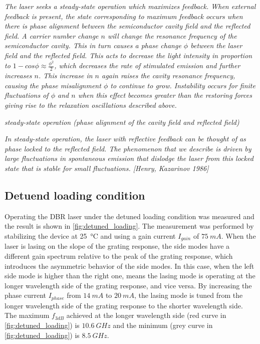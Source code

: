 \textit{The laser seeks a steady-state operation which maximizes feedback. When external feedback is present, the state corresponding to maximum feedback occurs when there is phase alignment  between the semiconductor cavity field and the reflected field. A carrier number change $n$ will change the resonance frequency of the semiconductor cavity. This in turn causes a phase change $\phi$ between the laser field and the reflected field. This acts to decrease the light intensity in proportion to $1-cos{\phi}\approx\frac{\phi^2}{2}$, which decreases the rate of stimulated emission and further increases $n$. This increase in $n$ again raises the cavity resonance frequency, causing the phase misalignment $\phi$ to continue to grow. Instability occurs for finite fluctuations of $\phi$ and $n$ when this effect becomes greater than the restoring forces giving rise to the relaxation oscillations described above.}

\textit{steady-state operation (phase alignment of the cavity field and reflected field)}

\textit{In steady-state operation, the laser with reflective feedback can be thought of as phase locked to the reflected field. The phenomenon that we describe is driven by large fluctuations in spontaneous emission that dislodge the laser from this locked state that is stable for small fluctuations. [Henry, Kazarinov 1986]}

\subsection{Detuend loading condition}\label{subsec:detuned_laoding_measurement}
Operating the DBR laser under the detuned loading condition was measured and the result is shown in \autoref{fig:detuned_loading}. The measurement was performed by stabilizing the device at \SI{25}{\celsius} and using a gain current $I_{gain}$ of $75 \ mA$. When the laser is lasing on the slope of the grating response, the side modes have a different gain spectrum relative to the peak of the grating response, which introduces the asymmetric behavior of the side modes. In this case, when the left side mode is higher than the right one, means the lasing mode is operating at the longer wavelength side of the grating response, and vice versa. By increasing the phase current $I_{phase}$ from $14 \ mA$ to $20 \ mA$, the lasing mode is tuned from the longer wavelength side of the grating response to the shorter wavelength side. The maximum $f_{3dB}$ achieved at the longer wavelength side (red curve in \autoref{fig:detuned_loading}) is $10.6 \ GHz$ and the minimum (grey curve in \autoref{fig:detuned_loading}) is $8.5 \ GHz$. 

